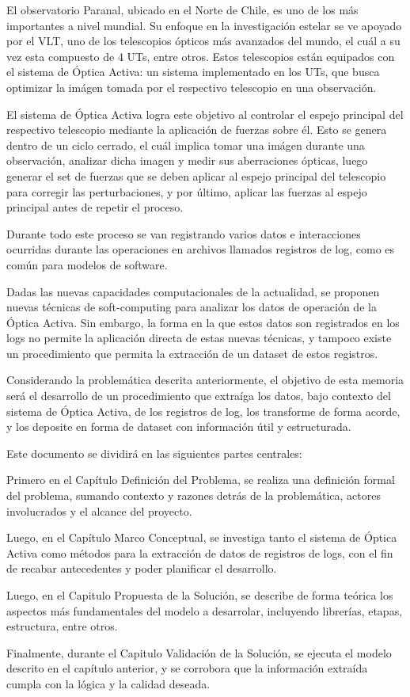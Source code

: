 
El observatorio Paranal, ubicado en el Norte de Chile, es uno de los más importantes a nivel mundial. Su enfoque en la investigación estelar se ve apoyado por el VLT, uno de los telescopios ópticos más avanzados del mundo, el cuál a su vez esta compuesto de 4 UTs, entre otros. Estos telescopios están equipados con el sistema de Óptica Activa: un sistema implementado en los UTs, que busca optimizar la imágen tomada por el respectivo telescopio en una observación.

El sistema de Óptica Activa logra este objetivo al controlar el espejo principal del respectivo telescopio mediante la aplicación de fuerzas sobre él. Esto se genera dentro de un ciclo cerrado, el cuál implica tomar una imágen durante una observación, analizar dicha imagen y medir sus aberraciones ópticas, luego generar el set de fuerzas que se deben aplicar al espejo principal del telescopio para corregir las perturbaciones, y por último, aplicar las fuerzas al espejo principal antes de repetir el proceso.

Durante todo este proceso se van registrando varios datos e interacciones ocurridas durante las operaciones en archivos llamados registros de log, como es común para modelos de software.

Dadas las nuevas capacidades computacionales de la actualidad, se proponen nuevas técnicas de soft-computing para analizar los datos de operación de la Óptica Activa. Sin embargo, la forma en la que estos datos son registrados en los logs no permite la aplicación directa de estas nuevas técnicas, y tampoco existe un procedimiento que permita la extracción de un dataset de estos registros.

Considerando la problemática descrita anteriormente, el objetivo de esta memoria será el desarrollo de un procedimiento que extraíga los datos, bajo contexto del sistema de Óptica Activa, de los registros de log, los transforme de forma acorde, y los deposite en forma de dataset con información útil y estructurada.

Este documento se dividirá en las siguientes partes centrales:

Primero en el Capítulo Definición del Problema, se realiza una definición formal del problema, sumando contexto y razones detrás de la problemática, actores involucrados y el alcance del proyecto.

Luego, en el Capítulo Marco Conceptual, se investiga tanto el sistema de Óptica Activa como métodos para la extracción de datos de registros de logs, con el fin de recabar antecedentes y poder planificar el desarrollo.

Luego, en el Capitulo Propuesta de la Solución, se describe de forma teórica los aspectos más fundamentales del modelo a desarrolar, incluyendo librerías, etapas, estructura, entre otros.

Finalmente, durante el Capitulo Validación de la Solución, se ejecuta el modelo descrito en el capítulo anterior, y se corrobora que la información extraída cumpla con la lógica y la calidad deseada.